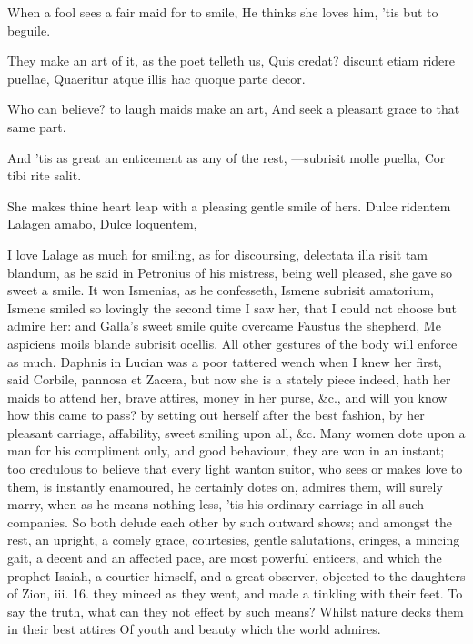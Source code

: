 {When a fool sees a fair maid for to smile,
He thinks she loves him, 'tis but to beguile.

They make an art of it, as the poet telleth us,
Quis credat? discunt etiam ridere puellae,
Quaeritur atque illis hac quoque parte decor.

Who can believe? to laugh maids make an art,
And seek a pleasant grace to that same part.

And 'tis as great an enticement as any of the rest,
---subrisit molle puella,
Cor tibi rite salit.

She makes thine heart leap with a pleasing gentle smile of hers.
Dulce ridentem Lalagen amabo,
Dulce loquentem,

I love Lalage as much for smiling, as for discoursing, delectata illa
risit tam blandum, as he said in Petronius of his mistress, being well
pleased, she gave so sweet a smile. It won Ismenias, as he 
confesseth, Ismene subrisit amatorium, Ismene smiled so lovingly the
second time I saw her, that I could not choose but admire her: and
Galla's sweet smile quite overcame Faustus the shepherd, Me
aspiciens moils blande subrisit ocellis. All other gestures of the body
will enforce as much. Daphnis in Lucian was a poor tattered wench
when I knew her first, said Corbile, pannosa et Zacera, but now she is
a stately piece indeed, hath her maids to attend her, brave attires,
money in her purse, \&c., and will you know how this came to pass? by
setting out herself after the best fashion, by her pleasant carriage,
affability, sweet smiling upon all, \&c. Many women dote upon a man for
his compliment only, and good behaviour, they are won in an instant;
too credulous to believe that every light wanton suitor, who sees or
makes love to them, is instantly enamoured, he certainly dotes on,
admires them, will surely marry, when as he means nothing less, 'tis
his ordinary carriage in all such companies. So both delude each other
by such outward shows; and amongst the rest, an upright, a comely
grace, courtesies, gentle salutations, cringes, a mincing gait, a
decent and an affected pace, are most powerful enticers, and which the
prophet Isaiah, a courtier himself, and a great observer, objected to
the daughters of Zion, iii. 16. they minced as they went, and made a
tinkling with their feet. To say the truth, what can they not effect by
such means?
Whilst nature decks them in their best attires
Of youth and beauty which the world admires.

}

